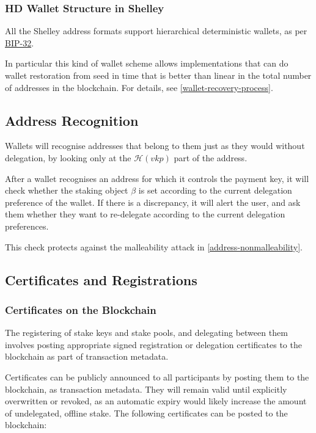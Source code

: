 \documentclass[11pt,a4paper]{article}
\begin{document}
\subsubsection{HD Wallet Structure in
Shelley}\label{hd-wallet-structure-in-shelley}

All the Shelley address formats support hierarchical deterministic
wallets, as per
\href{https://github.com/bitcoin/bips/blob/master/bip-0032.mediawiki.}{BIP-32}.

In particular this kind of wallet scheme allows implementations that can
do wallet restoration from seed in time that is better than linear in
the total number of addresses in the blockchain. For details, see
\ref{wallet-recovery-process}.

\subsection{Address Recognition}\label{address-recognition-1}

Wallets will recognise addresses that belong to them just as they would
without delegation, by looking only at the \(\mathcal{H}({vkp})\) part
of the address.

After a wallet recognises an address for which it controls the payment
key, it will check whether the staking object \(\beta\) is set according
to the current delegation preference of the wallet. If there is a
discrepancy, it will alert the user, and ask them whether they want to
re-delegate according to the current delegation preferences.

This check protects against the malleability attack in
\ref{address-nonmalleability}.

\subsection{Certificates and
Registrations}\label{certificates-and-registrations}

\subsubsection{Certificates on the
Blockchain}\label{certificates-on-the-blockchain}

The registering of stake keys and stake pools, and delegating between
them involves posting appropriate signed registration or delegation
certificates to the blockchain as part of transaction metadata.

Certificates can be publicly announced to all participants by posting
them to the blockchain, as transaction metadata. They will remain valid
until explicitly overwritten or revoked, as an automatic expiry would
likely increase the amount of undelegated, offline stake. The following
certificates can be posted to the blockchain:
\end{document}
